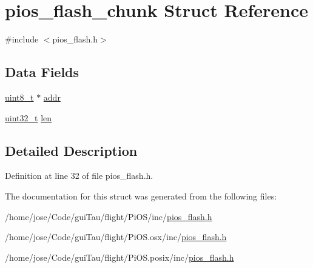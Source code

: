 \hypertarget{structpios__flash__chunk}{\section{pios\-\_\-flash\-\_\-chunk Struct Reference}
\label{structpios__flash__chunk}
}


{\ttfamily \#include $<$pios\-\_\-flash.\-h$>$}

\subsection*{Data Fields}
\begin{DoxyCompactItemize}
\item 
\hyperlink{stdint_8h_aba7bc1797add20fe3efdf37ced1182c5}{uint8\-\_\-t} $\ast$ \hyperlink{group___p_i_o_s___f_l_a_s_h_ga7430a2f72409d31bba3f3f00e27a82bd}{addr}
\item 
\hyperlink{stdint_8h_a435d1572bf3f880d55459d9805097f62}{uint32\-\_\-t} \hyperlink{group___p_i_o_s___f_l_a_s_h_ga127467a644fb34d50d9c074535dcaec3}{len}
\end{DoxyCompactItemize}


\subsection{Detailed Description}


Definition at line 32 of file pios\-\_\-flash.\-h.



The documentation for this struct was generated from the following files\-:\begin{DoxyCompactItemize}
\item 
/home/jose/\-Code/gui\-Tau/flight/\-Pi\-O\-S/inc/\hyperlink{inc_2pios__flash_8h}{pios\-\_\-flash.\-h}\item 
/home/jose/\-Code/gui\-Tau/flight/\-Pi\-O\-S.\-osx/inc/\hyperlink{osx_2inc_2pios__flash_8h}{pios\-\_\-flash.\-h}\item 
/home/jose/\-Code/gui\-Tau/flight/\-Pi\-O\-S.\-posix/inc/\hyperlink{posix_2inc_2pios__flash_8h}{pios\-\_\-flash.\-h}\end{DoxyCompactItemize}
